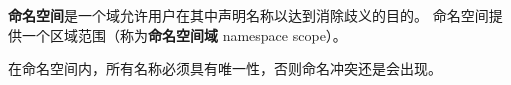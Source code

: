 \documentclass[../../LearnCpp.tex]{subfiles}
\begin{document}

\textbf{命名空间}是一个域允许用户在其中声明名称以达到消除歧义的目的。
命名空间提供一个区域范围（称为\textbf{命名空间域} namespace scope）。

在命名空间内，所有名称必须具有唯一性，否则命名冲突还是会出现。
\end{document}

